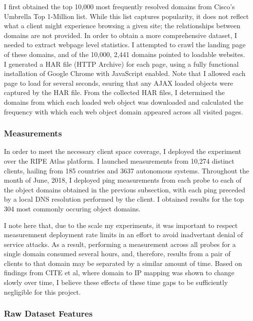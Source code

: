 I first obtained the top 10,000 most frequently resolved domains from Cisco's Umbrella Top
1-Million list. While this list captures popularity, it does not reflect what a client might
experience browsing a given site; the relationships between domains are not provided. In order to
obtain a more comprehensive dataset, I needed to extract webpage level statistics. I attempted to
crawl the landing page of these domains, and of the 10,000, 2,441 domains pointed to loadable
websites. I generated a HAR file (HTTP Archive) for each page, using a fully functional
installation of Google Chrome with JavaScript enabled. Note that I allowed each page to load for
several seconds, esuring that any AJAX loaded objects were captured by the HAR file. From the
collected HAR files, I determined the domains from which each loaded web object was downloaded and
calculated the frequency with which each web object domain appeared across all visited pages. 

\subsubsection{Measurements}

In order to meet the necessary client space coverage, I deployed the
experiment over the RIPE Atlas platform. I launched measurements from 10,274 distinct clients, hailing
from 185 countries and 3637 autonomous systems. Throughout the month of June, 2018, I deployed ping
measurements from each probe to each of the object domains obtained in the previous subsection, with
each ping preceded by a local DNS resolution performed by the client. I obtained results for the
top 304 most commonly occuring object domains. 

I note here that, due to the scale my experiments, it was important to respect measuremnent
deployment rate limits in an effort to avoid inadvertant denial of service attacks. As a result,
performing a measurement across all probes for a single domain consumed several hours, and,
therefore, results from a pair of clients to that domain may be separated by a similar amount of
time. Based on findings from CITE et al, where domain to IP mapping was shown to change slowly over
time, I believe these effects of these time gaps to be sufficiently negligible for this project. 

\subsubsection{Raw Dataset Features}

